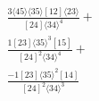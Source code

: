 \documentclass[varwidth, border=5pt]{standalone}
\begin{document}
\begin{my}
$\begin{gathered}
\scriptscriptstyle\frac{3⟨45⟩⟨35⟩[12]⟨23⟩}{[24]⟨34⟩^4}+\\
\scriptscriptstyle\frac{1[23]⟨35⟩^3[15]}{[24]^2⟨34⟩^4}+\\
\scriptscriptstyle\frac{-1[23]⟨35⟩^2[14]}{[24]^2⟨34⟩^3}\phantom{+}
\end{gathered}$
\end{my}
\end{document}
